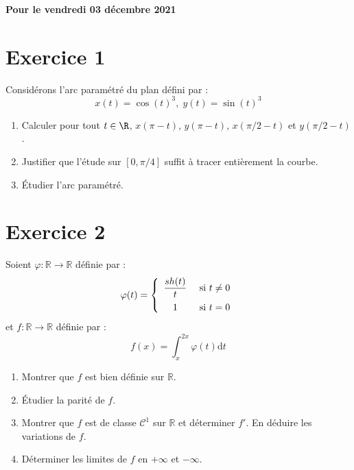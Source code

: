 \documentclass[a4paper,french,11pt,twoside]{VcCours}
\newcommand{\dt}{\text{d}t}
\begin{document}
\begin{center}
\large\bf 
Pour le vendredi 03 décembre 2021
\end{center}
\separationTitre

   
\section*{Exercice 1}   
Considérons l'arc paramétré du plan défini par :
$$ x(t) =\cos(t)^3, \; y(t) = \sin(t)^3 $$

\begin{enumerate}
\item Calculer pour tout $t \in \R$, $x(\pi-t)$, $y(\pi-t)$, $x(\pi/2-t)$ et $y(\pi/2-t)$.
\item Justifier que l'étude sur $[0,\pi/4]$ suffit à tracer entièrement la courbe.
\item Étudier l'arc paramétré.
\end{enumerate}
   
\section*{Exercice 2}   
Soient $\varphi : \mathbb{R} \rightarrow \mathbb{R}$ définie par :
$$ \varphi(t) = \left\lbrace \begin{array}{ccl}
\dfrac{sh(t)}{t} & \hbox{ si } t \neq 0 \\[0.3cm]
1 & \hbox{ si } t = 0 \\
\end{array}\right.$$
et $f : \mathbb{R} \rightarrow \mathbb{R}$ définie par :
$$ f(x) = \int_x^{2x} \varphi(t) \dt$$
\begin{enumerate}
\item Montrer que $f$ est bien définie sur $\mathbb{R}$.
\item Étudier la parité de $f$.
\item Montrer que $f$ est de classe $\mathcal{C}^1$ sur $\mathbb{R}$ et déterminer $f'$. En déduire les variations de $f$.
\item Déterminer les limites de $f$ en $+ \infty$ et $- \infty$.
\end{enumerate}
   
\end{document}
